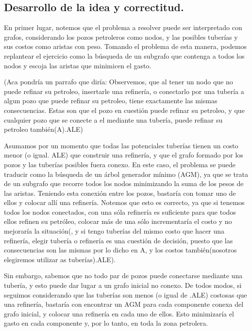 \vspace*{0.6cm}

\subsection{Desarrollo de la idea y correctitud.}

\vspace*{0.3cm}

En primer lugar, notemos que el problema a resolver puede ser interpretado con grafos, considerando los pozos petroleros como nodos, y las posibles tuberías y sus costos como aristas con peso.  Tomando el problema de esta manera, podemos replantear el ejercicio como la búsqueda de un subgrafo que contenga a todos los nodos y escoja las aristas que minimicen el gasto.

(Aca pondría un parrafo que diría: Observemos, que al tener un nodo que no puede refinar su petroleo, insertarle una refinería, o conectarlo por una tubería a algun pozo que puede refinar su petroleo, tiene exactamente las mismas consecuencias. Estas son que el pozo en cuestión puede refinar su petroleo, y que cualquier pozo que se conecte a el mediante una tubería, puede refinar su petroleo también(A).ALE)

Asumamos por un momento que todas las potenciales tuberías tienen un costo menor (o igual. ALE) que construir una refinería, y que el grafo formado por los pozos y las tuberías posibles fuera conexo.  En este caso, el problema se puede traducir como la búsqueda de un árbol generador mínimo (AGM), ya que se trata de un subgrafo que recorre todos los nodos minimizando la suma de los pesos de las aristas.  Teniendo esta conexión entre los pozos, bastaría con tomar uno de ellos y colocar allí una refinería. Notemos que esto es correcto, ya que si tenemos todos los nodos conectados, con una sóla refinería es suficiente para que todos ellos refinen su petróleo, colocar más de una sólo incrementaría el costo y no mejoraría la situación(, y si tengo tuberías del mismo costo que hacer una refinería, elegir tubería o refinería es una cuestión de decisión, puesto que las consecuencias son las mismas por lo dicho en A, y los costos también(nosotros elegiremos utilizar as tuberías).ALE).

Sin embargo, sabemos que no todo par de pozos puede conectarse mediante una tubería, y esto puede dar lugar a un grafo inicial no conexo.  De todos modos, si seguimos considerando que las tuberías son menos (o igual de .ALE) costosas que una refinería, bastaría con encontrar un AGM para cada componente conexa del grafo inicial, y colocar una refinería en cada uno de ellos. Esto minimizaría el gasto en cada componente y, por lo tanto, en toda la zona petrolera. 

